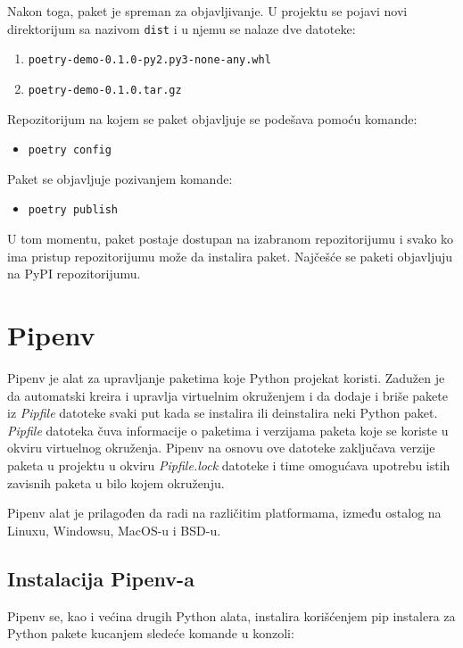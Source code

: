 \documentclass[12pt]{report}
\begin{document}
Nakon toga, paket je spreman za objavljivanje. U projektu se pojavi novi direktorijum sa nazivom \texttt{dist} i u njemu se nalaze dve datoteke:

\begin{enumerate}
    \item \texttt{poetry-demo-0.1.0-py2.py3-none-any.whl}
    \item \texttt{poetry-demo-0.1.0.tar.gz}
\end{enumerate}

Repozitorijum na kojem se paket objavljuje se podešava pomoću komande:

\begin{itemize}
    \item \texttt{poetry config}
\end{itemize}

Paket se objavljuje pozivanjem komande:

\begin{itemize}
    \item \texttt{poetry publish}
\end{itemize}

U tom momentu, paket postaje dostupan na izabranom repozitorijumu i svako ko ima pristup repozitorijumu može da instalira paket. Najčešće se paketi objavljuju na PyPI repozitorijumu.

\section{Pipenv}
Pipenv \cite{pipenv} je alat za upravljanje paketima koje Python projekat koristi. Zadužen je da automatski kreira i upravlja virtuelnim okruženjem i da dodaje i briše pakete iz \textit{Pipfile} datoteke svaki put kada se instalira ili deinstalira neki Python paket. \textit{Pipfile} datoteka čuva informacije o paketima i verzijama paketa koje se koriste u okviru virtuelnog okruženja. Pipenv na osnovu ove datoteke zaključava verzije paketa u projektu u okviru \textit{Pipfile.lock} datoteke i time omogućava upotrebu istih zavisnih paketa u bilo kojem okruženju.

Pipenv alat je prilagođen da radi na različitim platformama, između ostalog na Linux­u, Windows­u, MacOS-u i BSD-u.

\subsection{Instalacija Pipenv-a}

Pipenv se, kao i većina drugih Python alata, instalira korišćenjem pip instalera za Python pakete kucanjem sledeće komande u konzoli:
\end{document}
